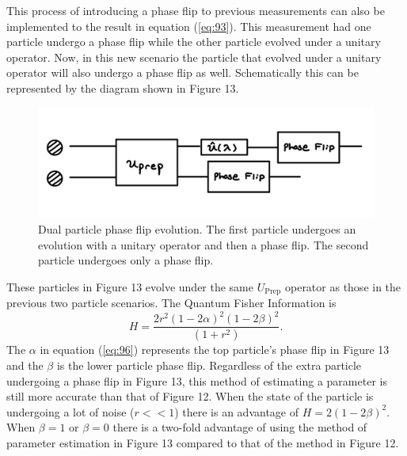 \documentclass[twocolumn]{article}
\begin{document}
This process of introducing a phase flip to previous measurements can also be implemented to the result in equation (\ref{eq:93}). This measurement had one particle undergo a phase flip while the other particle evolved under a unitary operator. Now, in this new scenario the particle that evolved under a unitary operator will also undergo a phase flip as well. Schematically this can be represented by the diagram shown in Figure 13.
\begin{figure}[h]
\begin{center}
\includegraphics[width=0.70\linewidth]{TP-Dual-Phase-Flip.PNG}
\caption{Dual particle phase flip evolution. The first particle undergoes an evolution with a unitary operator and then a phase flip. The second particle undergoes only a phase flip.}
\end{center}
\end{figure}
\newpage
These particles in Figure 13 evolve under the same $U_{\text{Prep}}$ operator as those in the previous two particle scenarios. The Quantum Fisher Information is
\begin{equation}\label{eq:96}
H=\frac{2r^2(1-2\alpha)^2(1-2\beta)^2}{(1+r^2)}.
\end{equation}
The $\alpha$ in equation (\ref{eq:96}) represents the top particle's phase flip in Figure 13 and the $\beta$ is the lower particle phase flip. Regardless of the extra particle undergoing a phase flip in Figure 13, this method of estimating a parameter is still more accurate than that of Figure 12. When the state of the particle is undergoing a lot of noise ($r<<1$) there is an advantage of $H=2(1-2\beta)^2$. When $\beta=1$ or $\beta=0$ there is a two-fold advantage of using the method of parameter estimation in Figure 13 compared to that of the method in Figure 12.
\end{document}
